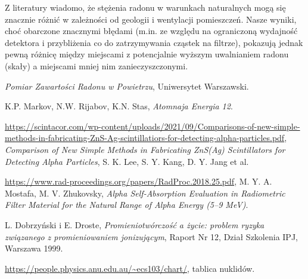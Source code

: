 \documentclass[12pt]{article}
\begin{document}
Z literatury \cite{concentration} wiadomo, że stężenia radonu w warunkach naturalnych mogą się znacznie różnić w zależności od geologii i wentylacji pomieszczeń. Nasze wyniki, choć obarczone znacznymi błędami (m.in. ze względu na ograniczoną wydajność detektora i przybliżenia co do zatrzymywania cząstek na filtrze), pokazują jednak pewną różnicę między miejscami z potencjalnie wyższym uwalnianiem radonu (skały) a miejscami mniej nim zanieczyszczonymi.

\newpage

\begin{thebibliography}{5}

	\emph{Pomiar Zawartości Radonu w Powietrzu}, Uniwersytet Warszawski.

	K.P. Markov, N.W. Rijabov, K.N. Stas, \emph{Atomnaja Energia 12}.

	\url{https://scintacor.com/wp-content/uploads/2021/09/Comparisons-of-new-simple-methods-in-fabricating-ZnS-Ag-scintillatiors-for-detecting-alpha-particles.pdf},
	\emph{Comparison of New Simple Methods in Fabricating ZnS(Ag) Scintillators for Detecting Alpha Particles}, 
	S. K. Lee, S. Y. Kang, D. Y. Jang et al.

	\url{https://www.rad-proceedings.org/papers/RadProc.2018.25.pdf},
	M. Y. A. Mostafa, M. V. Zhukovsky, \emph{Alpha Self-Absorption Evaluation in Radiometric Filter Material for the Natural Range of Alpha Energy (5–9 MeV)}.

	L. Dobrzyński i E. Droste, \emph{Promieniotwórczość a życie: problem ryzyka związanego z promieniowaniem jonizującym}, Raport Nr 12, Dział Szkolenia IPJ, Warszawa 1999.

    \url{https://people.physics.anu.edu.au/~ecs103/chart/}, tablica nuklidów.

\end{thebibliography}
\end{document}
